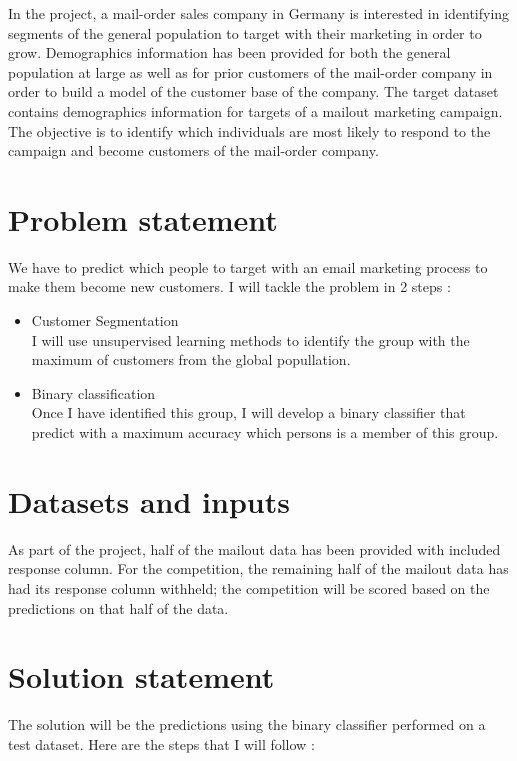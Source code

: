 \documentclass[12pt]{article}
\begin{document}
In the project, a mail-order sales company in Germany is interested in identifying segments of the general population to target with their marketing in order to grow. Demographics information has been provided for both the general population at large as well as for prior customers of the mail-order company in order to build a model of the customer base of the company. The target dataset contains demographics information for targets of a mailout marketing campaign. The objective is to identify which individuals are most likely to respond to the campaign and become customers of the mail-order company.


\section{Problem statement}

We have to predict which people to target with an email marketing process to make them become new customers. I will tackle the problem in 2 steps :
\begin{itemize}
\item{Customer Segmentation}\\
I will use unsupervised learning methods to identify the group with the maximum of customers from the global popullation. 
\item{Binary classification}\\
Once I have identified this group, I will develop a binary classifier that predict with a maximum accuracy which persons is a member of this group.
\end{itemize}

\section{Datasets and inputs}

As part of the project, half of the mailout data has been provided with included response column. For the competition, the remaining half of the mailout data has had its response column withheld; the competition will be scored based on the predictions on that half of the data.

\section{Solution statement}

The solution will be the predictions using the binary classifier performed on a test dataset. Here are the steps that I will follow :
\end{document}
